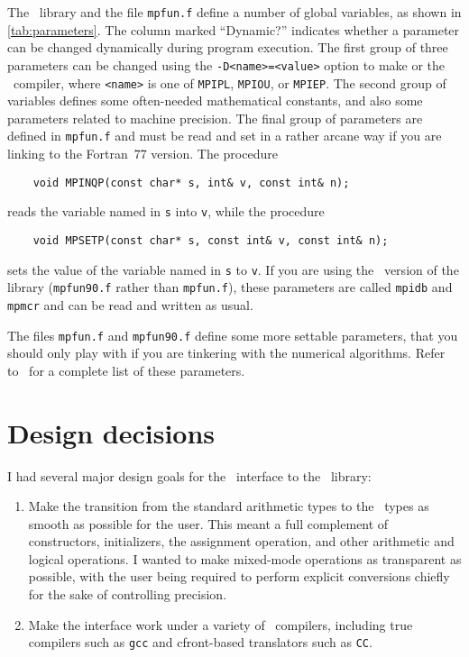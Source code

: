 The \mp\ library and the file \verb|mpfun.f| define a number of
global variables,
as shown in \ref{tab:parameters}.
The column marked ``Dynamic?'' indicates whether a parameter can be
changed dynamically during program execution.
The first group of three parameters can be changed using the
\verb|-D<name>=<value>| option to make or the \CC\ compiler,
where \verb|<name>| is one of \verb|MPIPL|, \verb|MPIOU|, or
\verb|MPIEP|.
The second group of variables defines some often-needed mathematical
constants,
and also some parameters related to machine precision.
The final group of parameters are defined in \verb|mpfun.f| and must
be read and set in a rather arcane way if you are linking to the
Fortran~77 version.
The procedure
\begin{verbatim}
    void MPINQP(const char* s, int& v, const int& n);
\end{verbatim}
reads the variable named in \verb|s| into \verb|v|,
while the procedure
\begin{verbatim}
    void MPSETP(const char* s, const int& v, const int& n);
\end{verbatim}
sets the value of the variable named in \verb|s| to \verb|v|.
If you are using the \Fninety\ version of the library
(\verb|mpfun90.f| rather than \verb|mpfun.f|),
these parameters are called \verb|mpidb| and \verb|mpmcr| and can be
read and written as usual.

The files \verb|mpfun.f| and \verb|mpfun90.f| define some more
settable parameters,
that you should only play with if you are tinkering with the numerical
algorithms.
Refer to~\cite{bailey:94} for a complete list of these parameters.

\section{Design decisions}

I had several major design goals for the \CC\ interface to the \mp\
library:
\begin{enumerate}
\item
Make the transition from the standard arithmetic types to the \mp\
types as smooth as possible for the user.
This meant a full complement of constructors,
initializers,
the assignment operation,
and other arithmetic and logical operations.
I wanted to make mixed-mode operations as transparent as possible,
with the user being required to perform explicit conversions chiefly
for the sake of controlling precision.

\item
Make the interface work under a variety of \CC\ compilers,
including true compilers such as \verb|gcc| and cfront-based
translators such as \verb|CC|.
\end{enumerate}

